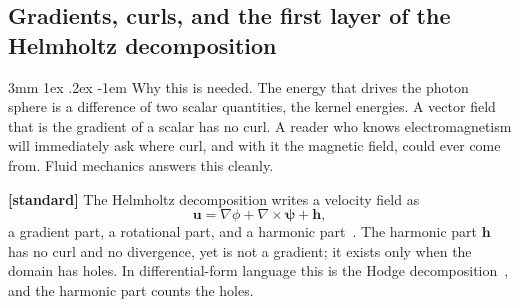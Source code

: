 \documentclass[%
 reprint, amsmath,amssymb, aps, prb, ]{revtex4-2}
\makeatletter
\numberwithin{equation}{section}
\renewcommand\paragraph{%
  \@startsection{paragraph}{4}{\z@}%
    {3mm \@plus 1ex \@minus .2ex}%
    {-1em}%
    {\normalfont\normalsize\itshape}}
\makeatother
\begin{document}
\subsection{Gradients, curls, and the first layer of the Helmholtz decomposition}

\paragraph{Why this is needed.} The energy that drives the photon sphere is a difference of two scalar quantities, the kernel energies. A vector field that is the gradient of a scalar has no curl. A reader who knows electromagnetism will immediately ask where curl, and with it the magnetic field, could ever come from. Fluid mechanics answers this cleanly.

\textbf{[standard]} The Helmholtz decomposition writes a velocity field as
\begin{equation}
\mathbf{u} = \nabla\phi + \nabla\times\bm{\psi} + \mathbf{h},
\label{eq:helmholtz}
\end{equation}
a gradient part, a rotational part, and a harmonic part~\cite{ref:helmholtz,ref:bhatia}. The harmonic part $\mathbf{h}$ has no curl and no divergence, yet is not a gradient; it exists only when the domain has holes. In differential-form language this is the Hodge decomposition~\cite{ref:hodge}, and the harmonic part counts the holes.
\end{document}
